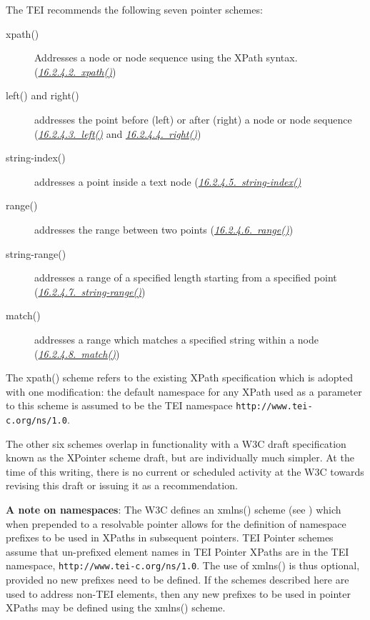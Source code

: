The TEI recommends the following seven pointer schemes: \begin{description}

\item[{ {\name xpath()}}]Addresses a node or node sequence using the XPath syntax. (\textit{\hyperref[SATSXP]{16.2.4.2.\ xpath()}})
\item[{ {\name left()} and  {\name right()}}]addresses the point before (left) or after (right) a node or node sequence (\textit{\hyperref[SATSL]{16.2.4.3.\ left()}} and \textit{\hyperref[SATSR]{16.2.4.4.\ right()}})
\item[{ {\name string-index()}}]addresses a point inside a text node (\textit{\hyperref[SATSSI]{16.2.4.5.\ string-index()}}
\item[{ {\name range()}}]addresses the range between two points (\textit{\hyperref[SATSRN]{16.2.4.6.\ range()}})
\item[{ {\name string-range()}}]addresses a range of a specified length starting from a specified point (\textit{\hyperref[SATSSR]{16.2.4.7.\ string-range()}})
\item[{ {\name match()}}]addresses a range which matches a specified string within a node (\textit{\hyperref[SATSMA]{16.2.4.8.\ match()}})
\end{description} \par
The  {\name xpath()} scheme refers to the existing XPath specification which is adopted with one modification: the default namespace for any XPath used as a parameter to this scheme is assumed to be the TEI namespace \texttt{http://www.tei-c.org/ns/1.0}.\par
The other six schemes overlap in functionality with a W3C draft specification known as the  {\name XPointer scheme} draft, but are individually much simpler. At the time of this writing, there is no current or scheduled activity at the W3C towards revising this draft or issuing it as a recommendation.\par
{\bfseries A note on namespaces}: The W3C defines an  {\name xmlns()} scheme (see ) which when prepended to a resolvable pointer allows for the definition of namespace prefixes to be used in XPaths in subsequent pointers. TEI Pointer schemes assume that un-prefixed element names in TEI Pointer XPaths are in the TEI namespace, \texttt{http://www.tei-c.org/ns/1.0}. The use of  {\name xmlns()} is thus optional, provided no new prefixes need to be defined. If the schemes described here are used to address non-TEI elements, then any new prefixes to be used in pointer XPaths may be defined using the  {\name xmlns()} scheme.
